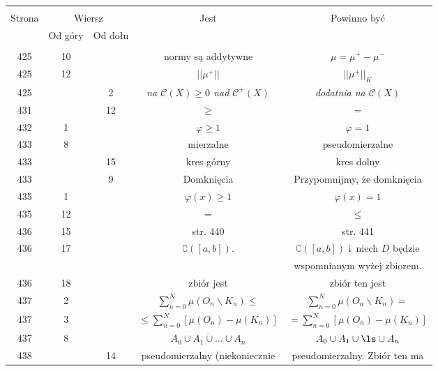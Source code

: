 \documentclass[a4paper]{article}
\newcommand{\ol}{\overline}
\newcommand{\ld}{\ldots}
\newcommand{\bs}{\backslash}
\begin{document}
\begin{center}
  \begin{tabular}{|c|c|c|c|c|}
    \hline
    & \multicolumn{2}{c|}{} & & \\
    Strona & \multicolumn{2}{c|}{Wiersz}& Jest & Powinno być \\ \cline{2-3}
    & Od góry & Od dołu &  &  \\ \hline
    & & & & \\
    425 & 10 & & normy są addytywne & $\mu = \mu^{ + } - \mu^{ - }$ \\
    425 & 12 & & $|| \mu^{ + } ||$ & $|| \mu^{ + } ||_{ K }$ \\
    425 & & 2 & \emph{na $\mathcal{C}( X ) \geq 0$ nad
                $\mathcal{C}^{ + }( X )$} 
           & \emph{dodatnia na $\mathcal{C}( X )$} \\
    431 & & 12 & $\geq$ & $=$ \\
    432 & 1 & & $\varphi \geq 1$ & $\varphi = 1$ \\
    433 & 8 & & mierzalne & pseudomierzalne \\
    433 & & 15 & kres górny & kres dolny \\
    433 & & 9 & Domknięcia & Przypomnijmy, że domknięcia \\
    435 & 1 & & $\varphi( x ) \geq 1$ & $\varphi( x ) = 1$ \\
    435 & 12 & & $=$ & $\leq$ \\
    436 & 15 & & str. 440 & str. 441 \\
    436 & 17 & & $\complement ( [ a, b ] )$. & $\complement ( [ a, b ] )$
                                               i~niech $D$ będzie \\
    & & & & wspomnianym wyżej zbiorem. \\
    436 & 18 & & zbiór jest & zbiór ten jest \\
    437 & 2 & & $\sum\limits^{ N }_{ n = 0 } \mu( O_{ n } \bs
                K_{ n } ) \leq$ & $\sum\limits^{ N }_{ n = 0 }
                                  \mu( O_{ n } \backslash K_{ n } ) =$ \\
    437 & 3 & & $\leq \sum\limits^{ N }_{ n = 0 } [ \mu( O_{ n } )
                - \mu( K_{ n } ) ]$ 
           & $= \sum\limits^{ N }_{ n = 0 } [ \mu( O_{ n } ) 
             - \mu( K_{ n } ) ]$ \\
    437 & 8 & & $\ol{ A_{ 0 } \cup A_{ 1 } \cup \ld \cup A_{ n } }$
           & $A_{ 0 } \cup A_{ 1 } \cup \ls \cup A_{ n }$ \\
    438 & & 14 & pseudomierzalny (niekoniecznie & pseudomierzalny. Zbiór
                                                  ten ma \\

\end{tabular}
\end{center}
\end{document}
